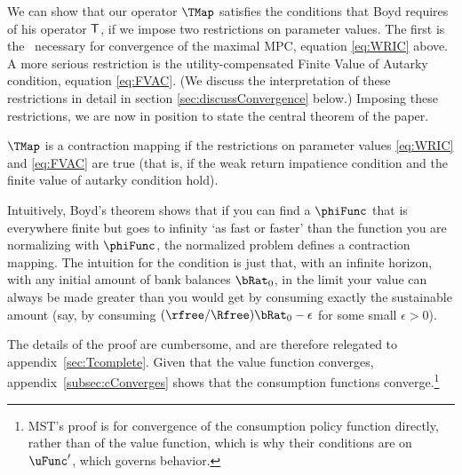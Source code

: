 \documentclass[BufferStockTheory]{subfiles}
\begin{document}
\begin{comment}
  Unpacking the definitions, our mapping $\TMap$ can be written more explicitly as
  \begin{align}
    \{\TMap\zFunc\}(\mRat_{t})  & = \underset{\cRat_{t} \in [\MinMinMPC
                                  \mRat_{t}, \MaxMPC \mRat_{t}]} \max \left\{
                                  \uFunc(c_{t})+\DiscFac \Ex_{t}\left[ {\PGro}_{t+1} ^{1-\CRRA }\zFunc(
                                  {\aRat}_{t}\Rnorm_{t+1}+\tShkAll_{t+1}) \right] \right\}
                                  .
  \end{align}
\end{comment}

\hypertarget{Contraction-Conditions}{}

We can show that our operator $\TMap$ satisfies the conditions that
Boyd requires of his operator $\mathsf{T}$, if we impose two restrictions
on parameter values.  The first is the \WRIC~necessary for
convergence of the maximal MPC, equation \eqref{eq:WRIC} above.  A
more serious restriction is the utility-compensated Finite Value of
Autarky condition, equation \eqref{eq:FVAC}.  (We discuss the
interpretation of these restrictions in detail in section
\ref{sec:discussConvergence} below.)  Imposing these restrictions, we
are now in position to state the central theorem of the paper.

\hypertarget{MainTheorem}{}
\setcounter{theorem}{0}
\begin{theorem}
  \label{thm:contmap} $\TMap$ is a contraction mapping if
  the restrictions on parameter values \eqref{eq:WRIC} and
  \eqref{eq:FVAC} are true (that is, if the weak return impatience condition and the finite value of autarky condition hold).
\end{theorem}

Intuitively, Boyd's theorem shows that if you can find a $\phiFunc$ that is everywhere finite but goes to infinity `as fast or faster' than the function you are normalizing with $\phiFunc$, the normalized problem defines a contraction mapping.  The intuition for the {\FVAC} condition is just that, with an infinite horizon, with any initial amount of bank balances $\bRat_{0}$, in the limit your value can always be made greater than you would get by consuming exactly the sustainable amount (say, by consuming $(\rfree/\Rfree)\bRat_{0}-\epsilon$ for some small $\epsilon>0$).

The details of the proof are cumbersome, and are therefore relegated to
appendix~\ref{sec:Tcomplete}.  Given that the value function
converges, appendix~\ref{subsec:cConverges} shows that the consumption
functions converge.\footnote{MST's proof is for convergence of the consumption policy function directly, rather than of the value function, which is why their conditions are on $\uFunc^{\prime}$, which governs behavior.}
\end{document}
